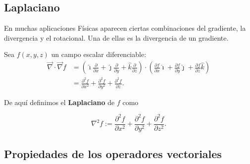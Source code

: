 \subsection*{Laplaciano}

En muchas aplicaciones Físicas aparecen ciertas combinaciones del gradiente, la divergencia y el rotacional. Una de ellas es la divergencia de un gradiente.

Sea $f(x,y,z)$ un campo escalar diferenciable:
\begin{align*}
    \vec{\nabla} \cdot \vec{\nabla} f &=  \left( \hat{\imath} \frac{\partial}{\partial x}  + \hat{\jmath} \frac{\partial}{\partial y}   + \hat{k}\frac{\partial}{\partial z}  \right) \cdot \left( \frac{\partial f}{\partial x} \hat{\imath} + \frac{\partial f}{\partial y} \hat{\jmath} + \frac{\partial f}{\partial z} \hat{k} \right) \\
&= \frac{\partial^2 f }{\partial x^2} + \frac{\partial^2 f}{\partial y^2} + \frac{\partial^2 f}{\partial z} .  
\end{align*}

De aquí definimos el \textbf{Laplaciano} de $f$ como
\begin{shaded}
    $$\nabla^2 f := \frac{\partial^2 f }{\partial x^2} + \frac{\partial^2 f}{\partial y^2} + \frac{\partial^2 f}{\partial z^2}.$$
\end{shaded}

\subsection*{Propiedades de los operadores vectoriales}

